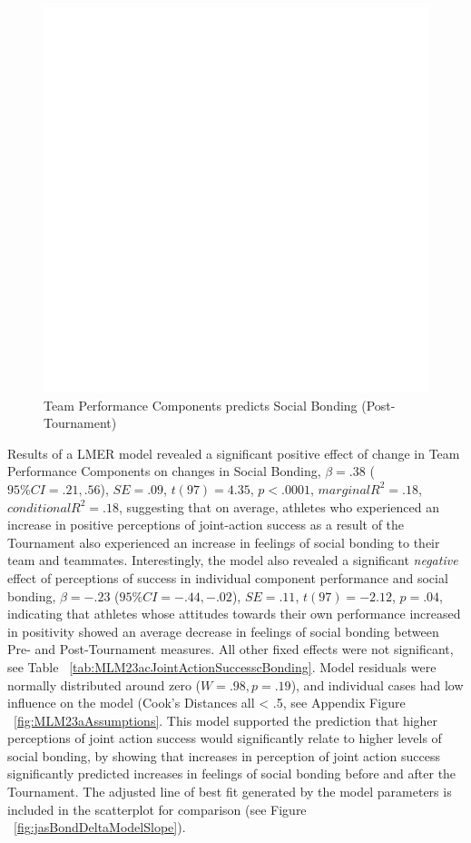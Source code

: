 \begin{CJK}{UTF8}{gbsn}
\begin{figure}[htbp]
  \centering
\includegraphics[scale=.5]{images/jasBondDeltaBasicXY.pdf}
  \caption{Team Performance Components predicts Social Bonding (Post-Tournament)}
  \label{fig:jasBondDeltaBasicXY}
\end{figure}


Results of a LMER model revealed a significant positive effect of change in Team Performance Components on changes in Social Bonding, $\beta = .38$ ($95\% CI =  .21, .56$), $SE = .09$, $t(97) = 4.35$, $p < .0001$, $marginal R^2 = .18$, $conditional R^2 = .18$, suggesting that on average, athletes who experienced an increase in positive perceptions of joint-action success as a result of the Tournament also experienced an increase in feelings of social bonding to their team and teammates.  Interestingly, the model also revealed a significant \textit{negative} effect of perceptions of success in individual component performance and social bonding, $\beta = -.23$ ($95\% CI =  -.44, -.02$), $SE = .11$, $t(97) = -2.12$, $p = .04$, indicating that athletes whose attitudes towards their own performance increased in positivity showed an average decrease in feelings of social bonding between Pre- and Post-Tournament measures. All other fixed effects were not significant, see Table ~\ref{tab:MLM23acJointActionSuccesscBonding}. Model residuals were normally distributed around zero ($W = .98, p = .19$), and individual cases had low influence on the model (Cook's Distances all < .5, see Appendix Figure ~\ref{fig:MLM23aAssumptions}.  This model supported the prediction that higher perceptions of joint action success would significantly relate to higher levels of social bonding, by showing that increases in perception of joint action success significantly predicted increases in feelings of social bonding before and after the Tournament.  The adjusted line of best fit generated by the model parameters is included in the scatterplot for comparison (see Figure ~\ref{fig:jasBondDeltaModelSlope}).


\end{CJK}
